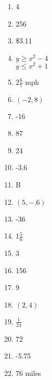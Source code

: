 \documentclass[../uilmath.tex]{subfiles}
\begin{document}
\begin{enumerate}[label=\bfseries\arabic*.]
    \item %
    4

    \item %
    256 

    \item %
    \$3.11

    \item %
    $y\geq x^2-4$\\
    $y\leq x^2+1$

    \item %
    $2\frac{6}{7}$ mph 

    \item %
    $(-2,8)$

    \item %
    -16

    \item %
    87

    \item %
    24

    \item %
    -3.6

    \item %
    B 

    \item %
    $(5,-.6)$

    \item %
    -36

    \item %
    $1\frac{5}{6}$

    \item %
    3 

    \item %
    156

    \item %
    9

    \item %
    $(2,4)$

    \item %
    $\frac{1}{24}$

    \item %
    72

    \item %
    -5.75

    \item %
    76 miles 


\end{enumerate}
\end{document}
